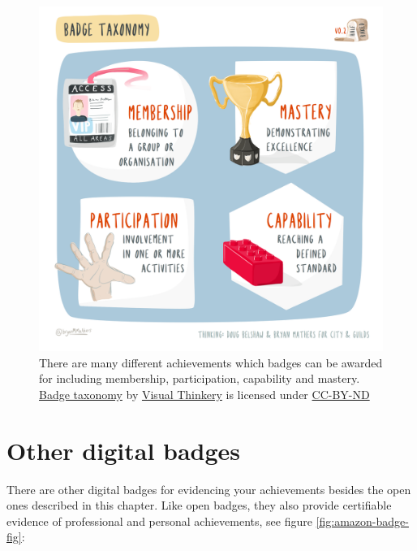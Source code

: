 \documentclass[
]{book}
\begin{document}
\begin{figure}

{\centering \includegraphics[width=0.99\linewidth]{images/badge-taxonomy-v2} 

}

\caption{There are many different achievements which badges can be awarded for including membership, participation, capability and mastery. \href{https://bryanmmathers.com/badge-taxonomy-v0-2/}{Badge taxonomy} by \href{https://visualthinkery.com/}{Visual Thinkery} is licensed under \href{https://creativecommons.org/licenses/by-nd/4.0/}{CC-BY-ND}}\label{fig:badgetype-fig}
\end{figure}



\hypertarget{otherbadges}{%
\section{Other digital badges}\label{otherbadges}}

There are other digital badges for evidencing your achievements besides the open ones described in this chapter. Like open badges, they also provide certifiable evidence of professional and personal achievements, see figure \ref{fig:amazon-badge-fig}:
\end{document}
